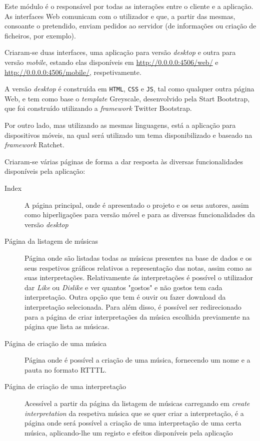 \documentclass[a4paper,11pt,openright,oneside]{report}
\begin{document}
Este módulo é o responsável por todas as interações entre o cliente e a aplicação. As interfaces Web comunicam com o utilizador e que, a partir das mesmas, consoante o pretendido, enviam pedidos ao servidor (de informações ou criação de ficheiros, por exemplo).

Criaram-se duas interfaces, uma aplicação para versão \textit{desktop} e outra para versão \textit{mobile}, estando elas disponíveis em \url{http://0.0.0.0:4506/web/} e \url{http://0.0.0.0:4506/mobile/}, respetivamente.

A versão \textit{desktop} é construída em \verb|HTML|, \verb|CSS| e \verb|JS|, tal como qualquer outra página Web, e tem como base o \textit{template} Greyscale, desenvolvido pela Start Bootstrap, que foi construído utilizando a \textit{framework} Twitter Bootstrap.

Por outro lado, mas utilizando as mesmas linguagens, está a aplicação para dispositivos móveis, na qual será utilizado um tema disponibilizado e baseado na \textit{framework} Ratchet.

Criaram-se várias páginas de forma a dar resposta às diversas funcionalidades disponíveis pela aplicação:

\begin{description}
\item[Index]
A página principal, onde é apresentado o projeto e os seus autores, assim como hiperligações para versão móvel e para as diversas funcionalidades da versão \textit{desktop}
\item[Página da listagem de músicas]
Página onde são listadas todas as músicas presentes na base de dados e os seus respetivos gráficos relativos a representação das notas, assim como as suas interpretações. Relativamente ás interpretações é possível o utilizador dar \textit{Like} ou \textit{Dislike} e ver quantos "gostos" e não gostos tem cada interpretação. Outra opção que tem é ouvir ou fazer download da interpretação selecionada. Para além disso, é possível ser redirecionado para a página de criar interpretações da música escolhida previamente na página que lista as músicas. 
\item[Página de criação de uma música]
Página onde é possível a criação de uma música, fornecendo um nome e a pauta no formato RTTTL.
\item[Página de criação de uma interpretação]
Acessível a partir da página da listagem de músicas carregando em \textit{create interpretation} da respetiva música que se quer criar a interpretação, é a página onde será possível a criação de uma interpretação de uma certa música, aplicando-lhe um registo e efeitos disponíveis pela aplicação
\end{description}
\end{document}
